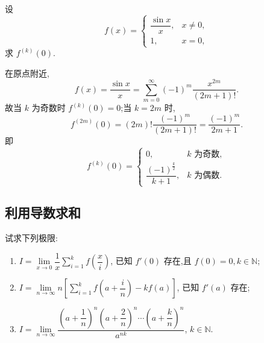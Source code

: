 \begin{example}
    设
    \[
        f(x)=
        \begin{cases}
            \dfrac{\sin x}{x}, & x\neq0, \\
            1,                 & x=0,
        \end{cases}
    \]
    求 $f^{(k)}(0)$.
\end{example}
\exampleblank

\begin{solution}
    在原点附近,
    \[
        f(x)=\dfrac{\sin x}{x}
        =\sum\limits_{m=0}^{\infty}(-1)^m\dfrac{x^{2m}}{(2m+1)!}.
    \]
    故当 $k$ 为奇数时 $f^{(k)}(0)=0$;当 $k=2m$ 时,
    \[
        f^{(2m)}(0)
        =(2m)!\dfrac{(-1)^m}{(2m+1)!}
        =\dfrac{(-1)^m}{2m+1}.
    \]
    即
    \[
        f^{(k)}(0)=
        \begin{cases}
            0,                               & k\text{ 为奇数}, \\
            \dfrac{(-1)^{\frac{k}{2}}}{k+1}, & k\text{ 为偶数}.
        \end{cases}
    \]
\end{solution}



\subsection{利用导数求和}

\begin{example}
    试求下列极限:
    \begin{enumerate}
        \item $\displaystyle
                  I=\lim\limits_{x\to0}\dfrac{1}{x}\sum\limits_{i=1}^k f\left(\dfrac{x}{i}\right)$,
              已知 $f'(0)$ 存在,且 $f(0)=0,k\in\mathbb{N}$;
        \item $\displaystyle
                  I=\lim\limits_{n\to\infty}n\left[\sum\limits_{i=1}^k f\left(a+\dfrac{i}{n}\right)-kf(a)\right]$,
              已知 $f'(a)$ 存在;
        \item $\displaystyle
                  I=\lim\limits_{n\to\infty}
                  \dfrac{\left(a+\dfrac{1}{n}\right)^n\left(a+\dfrac{2}{n}\right)^n\cdots\left(a+\dfrac{k}{n}\right)^n}{a^{nk}}$,
              $k\in\mathbb{N}$.
    \end{enumerate}
\end{example}
\exampleblank


